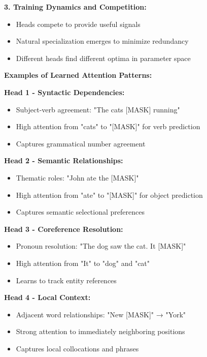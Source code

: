 \documentclass[12pt]{article}
\begin{document}
\begin{center}
\begin{enumerate}[(a)]
\begin{enumerate}[(a)]
{    \textbf{3. Training Dynamics and Competition:}
    \begin{itemize}
        \item Heads compete to provide useful signals
        \item Natural specialization emerges to minimize redundancy
        \item Different heads find different optima in parameter space
    \end{itemize}
    
    \textbf{Examples of Learned Attention Patterns:}
    
    \textbf{Head 1 - Syntactic Dependencies:}
    \begin{itemize}
        \item Subject-verb agreement: "The cats [MASK] running"
        \item High attention from "cats" to "[MASK]" for verb prediction
        \item Captures grammatical number agreement
    \end{itemize}
    
    \textbf{Head 2 - Semantic Relationships:}
    \begin{itemize}
        \item Thematic roles: "John ate the [MASK]"
        \item High attention from "ate" to "[MASK]" for object prediction
        \item Captures semantic selectional preferences
    \end{itemize}
    
    \textbf{Head 3 - Coreference Resolution:}
    \begin{itemize}
        \item Pronoun resolution: "The dog saw the cat. It [MASK]"
        \item High attention from "It" to "dog" and "cat"
        \item Learns to track entity references
    \end{itemize}
    
    \textbf{Head 4 - Local Context:}
    \begin{itemize}
        \item Adjacent word relationships: "New [MASK]" → "York"
        \item Strong attention to immediately neighboring positions
        \item Captures local collocations and phrases
    \end{itemize}
    
}
\end{enumerate}
\end{enumerate}
\end{center}
\end{document}
